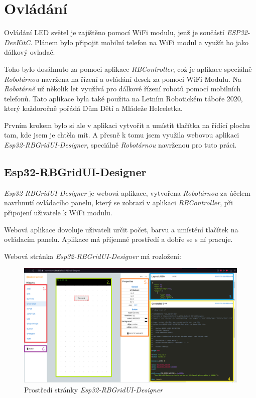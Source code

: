 \chapter{Ovládání}
Ovládání LED světel je zajištěno pomocí WiFi modulu, jenž je součástí \textit{ESP32-DevKitC}. Plánem bylo připojit mobilní telefon na WiFi modul a využít ho jako dálkový ovladač. 

Toho bylo dosáhnuto za pomoci aplikace \textit{RBController}\cite{RBControler}, což je aplikace speciálně \textit{Robotárnou}\cite{robotarna} navržena na řízení a ovládání desek za pomoci WiFi Modulu. Na \textit{Robotárně} už několik let využívá pro dálkové řízení robotů pomocí mobilních telefonů. Tato aplikace byla také použita na Letním Robotickém táboře 2020\cite{tabor}, který každoročně pořádá Dům Dětí a Mládeže Helceletka\cite{helceletka}.

Prvním krokem bylo si ale v aplikaci vytvořit a umístit tlačítka na řídící plochu tam, kde jsem je chtěla mít. A přesně k tomu jsem využila webovou aplikaci \textit{Esp32-RBGridUI-Designer}, speciálně \textit{Robotárnou} navrženou pro tuto práci.


\section{Esp32-RBGridUI-Designer} 
\textit{Esp32-RBGridUI-Designer}\cite{designer} je webová aplikace, vytvořena \textit{Robotárnou} za účelem navrhnutí ovládacího panelu, který se zobrazí v aplikaci \textit{RBController}, při připojení uživatele k WiFi modulu. 

Webová aplikace dovoluje uživateli určit počet, barvu a umístění tlačítek na ovládacím panelu. Aplikace má příjemné prostředí a dobře se s ní pracuje. 

Webová stránka {\em Esp32-RBGridUI-Designer} má rozložení: 


\begin{figure}[htbp]
	\centering
	\includegraphics[width=1\textwidth]{img/Esp32-RBGridUI-Designer.png}
	\caption{Prostředí stránky {\em Esp32-RBGridUI-Designer}}
\end{figure}

